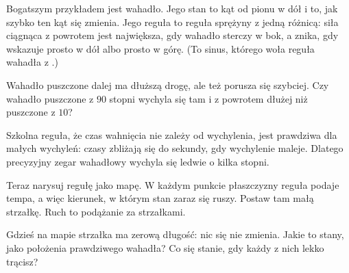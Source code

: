 Bogatszym przykładem jest wahadło. Jego stan to kąt od pionu w dół i to, jak
szybko ten kąt się zmienia. Jego reguła to reguła sprężyny z jedną różnicą:
siła ciągnąca z powrotem jest największa, gdy wahadło sterczy w bok, a znika,
gdy wskazuje prosto w dół albo prosto w górę. (To sinus, którego woła reguła
wahadła z .)

\begin{think}
Wahadło puszczone dalej ma dłuższą drogę, ale też porusza się szybciej. Czy
wahadło puszczone z $90$ stopni wychyla się tam i z powrotem dłużej niż
puszczone z $10$?
\end{think}



\noindent
Szkolna reguła, że czas wahnięcia nie zależy od wychylenia, jest prawdziwa
dla małych wychyleń: czasy zbliżają się do  sekundy, gdy
wychylenie maleje. Dlatego precyzyjny zegar wahadłowy wychyla się ledwie o
kilka stopni.

Teraz narysuj regułę jako mapę. W każdym punkcie płaszczyzny reguła podaje
tempa, a więc kierunek, w którym stan zaraz się ruszy. Postaw tam małą
strzałkę. Ruch to podążanie za strzałkami.

\begin{think}
Gdzieś na mapie strzałka ma zerową długość: nic się nie zmienia. Jakie to
stany, jako położenia prawdziwego wahadła? Co się stanie, gdy każdy z nich
lekko trącisz?
\end{think}



